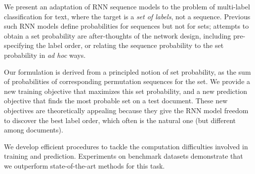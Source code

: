 We present an adaptation of RNN sequence models to the problem of multi-label classification for text, where the target is a \emph{set of labels}, not a sequence. Previous such RNN models define probabilities for sequences but not for sets; attempts to obtain a set probability are after-thoughts of the network design, including pre-specifying the label order, or relating the sequence probability to the set probability in \textit{ad hoc} ways.

Our formulation is derived from a principled notion of set probability, as the sum of probabilities of corresponding permutation sequences for the set. We provide a new training objective that maximizes this set probability, and a new prediction objective that finds the most probable set on a test document. These new objectives are theoretically appealing because they give the RNN model freedom to discover the best label order, which often is the natural one (but different among documents). 

We develop efficient procedures to tackle the computation difficulties involved in training and prediction. Experiments on benchmark datasets demonstrate that we outperform state-of-the-art methods for this task.
